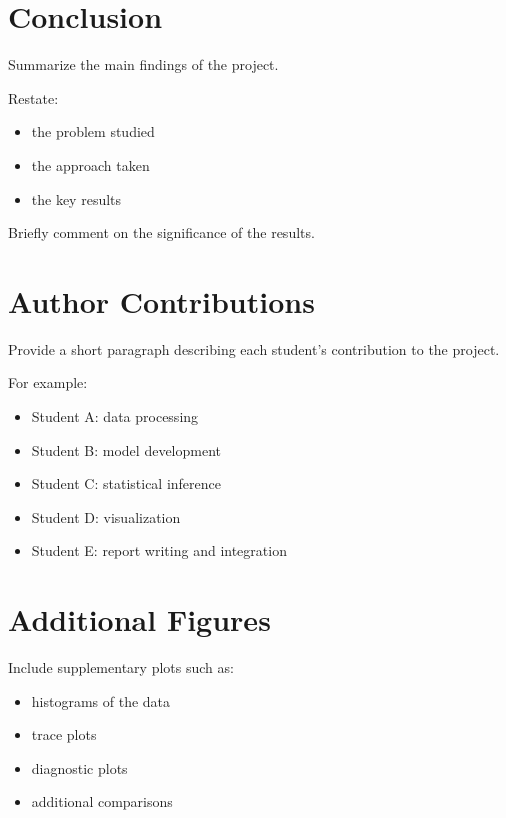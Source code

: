\documentclass[11pt]{article}
\begin{document}
\section{Conclusion}

Summarize the main findings of the project.

Restate:
\begin{itemize}
\item the problem studied
\item the approach taken
\item the key results
\end{itemize}

Briefly comment on the significance of the results.

\section*{Author Contributions}

Provide a short paragraph describing each student's contribution
to the project.

For example:
\begin{itemize}
\item Student A: data processing
\item Student B: model development
\item Student C: statistical inference
\item Student D: visualization
\item Student E: report writing and integration
\end{itemize}


\printbibliography

\appendix

\section{Additional Figures}

Include supplementary plots such as:
\begin{itemize}
\item histograms of the data
\item trace plots
\item diagnostic plots
\item additional comparisons
\end{itemize}
\end{document}
